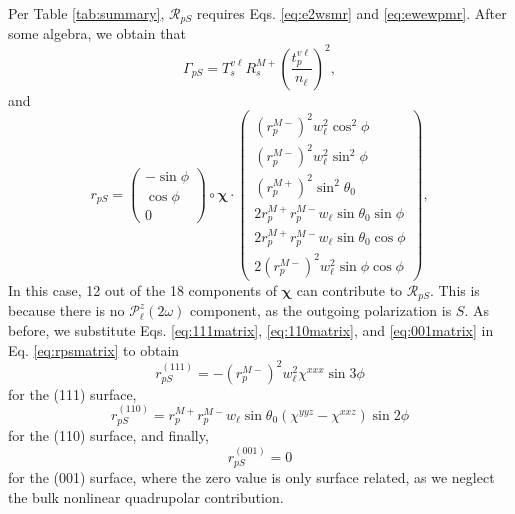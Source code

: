 \documentclass[aps,pra,10pt,amsmath,notitlepage,letterpaper]{revtex4-1}
\begin{document}
Per Table \ref{tab:summary}, $\mathcal{R}_{pS}$ requires Eqs. \eqref{eq:e2wsmr}
and \eqref{eq:ewewpmr}. After some algebra, we obtain that
\begin{equation}\label{mcv}
\Gamma_{pS} =
T_{s}^{v\ell}R^{M+}_{s}
\left(\frac{t^{v\ell}_{p}}{n_{\ell}}\right)^{2},
\end{equation}
and
\begin{equation}\label{eq:rpsmatrix}
r_{pS}=
\begin{pmatrix}
-\sin\phi\\
\cos\phi\\
0
\end{pmatrix}
\circ
\boldsymbol{\chi}
\cdot
\begin{pmatrix}
\left(r^{M-}_{p}\right)^{2}w^{2}_{\ell}\cos^{2}\phi\\[8pt]
\left(r^{M-}_{p}\right)^{2}w^{2}_{\ell}\sin^{2}\phi\\[8pt]
\left(r^{M+}_{p}\right)^{2}\sin^{2}\theta_{0}\\[8pt]
2r^{M+}_{p}r^{M-}_{p}w_{\ell}\sin\theta_{0}\sin\phi\\[8pt]
2r^{M+}_{p}r^{M-}_{p}w_{\ell}\sin\theta_{0}\cos\phi\\[8pt]
2\left(r^{M-}_{p}\right)^{2}w^{2}_{\ell}\sin\phi\cos\phi
\end{pmatrix}
,
\end{equation}
In this case, 12 out of the 18 components of $\boldsymbol{\chi}$ can contribute
to $\mathcal{R}_{pS}$. This is because there is no
$\mathcal{P}^{z}_\ell(2\omega)$ component, as the outgoing polarization is $S$.
As before, we substitute Eqs. \eqref{eq:111matrix}, \eqref{eq:110matrix}, and
\eqref{eq:001matrix} in Eq. \eqref{eq:rpsmatrix} to obtain
\begin{equation}\label{eq:rps111}
r^{(111)}_{pS} = - \left(r^{M-}_{p}\right)^{2}w^{2}_{\ell}\chi^{xxx}\sin3\phi
\end{equation}
for the (111) surface,
\begin{equation}\label{eq:rps110}
r^{(110)}_{pS} =
r^{M+}_{p}r^{M-}_{p}w_{\ell}\sin\theta_{0}(\chi^{yyz} - \chi^{xxz})\sin2\phi
\end{equation}
for the (110) surface, and finally,
\begin{equation}\label{eq:rps001}
r^{(001)}_{pS} = 0
\end{equation}
for the (001) surface, where the zero value is only surface related, as we
neglect the bulk nonlinear quadrupolar contribution.\cite{sipePRB87}


\end{document}
